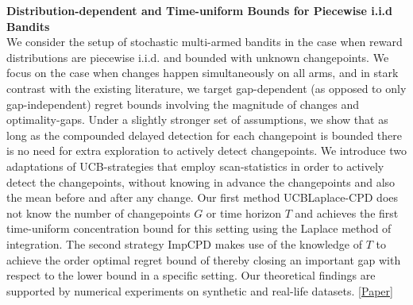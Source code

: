 \documentclass[margin,11pt]{res}
\begin{document}
\begin{resume}
\textbf{Distribution-dependent and Time-uniform Bounds for Piecewise i.i.d Bandits}\\
We consider the setup of stochastic multi-armed bandits in the case when reward distributions are piecewise i.i.d. and bounded with unknown changepoints. We focus on the case when changes happen simultaneously on all arms, and in stark contrast with the existing literature, we target gap-dependent (as opposed to only gap-independent) regret bounds involving the magnitude of changes and optimality-gaps. Under a slightly stronger set of assumptions, we show that as long as the compounded delayed detection for each changepoint is bounded there is no need for extra exploration to actively detect changepoints. We introduce two adaptations of UCB-strategies that employ scan-statistics in order to actively detect the changepoints, without knowing in advance the changepoints and also the mean before and after any change. Our first method UCBLaplace-CPD does not know the number of changepoints $G$ or time horizon $T$ and achieves the first time-uniform concentration bound for this setting using the Laplace method of integration. The second strategy ImpCPD makes use of the knowledge of $T$ to achieve the order optimal regret bound of thereby closing an important gap with respect to the lower bound in a specific setting. Our theoretical findings are supported by numerical experiments on synthetic and real-life datasets. \href{https://github.com/Subhojyoti/INRIA_Intern/blob/master/ICML2019/paper.pdf}{[Paper]}

%


\end{resume}
\end{document}
